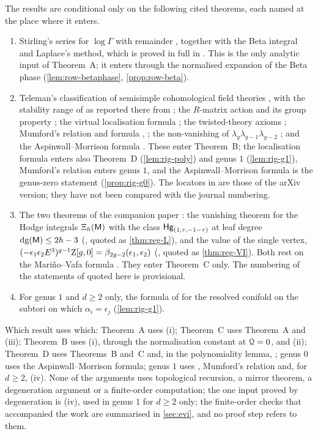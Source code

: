 The results are conditional only on the following cited theorems, each named at the place where it enters.
\begin{enumerate}
\item Stirling's series for $\log\Gamma$ with remainder \cite[5.11.1 and Section~5.11(ii)]{DLMF}, together with the Beta integral \cite[5.12.1]{DLMF} and Laplace's method, which is proved in full in . This is the only analytic input of Theorem~A; it enters through the normalised expansion of the Beta phase (\cref{lem:row-betaphase}, \cref{prop:row-beta}).
\item Teleman's classification of semisimple cohomological field theories \cite[Theorem~(2), (1.15), Prop.~8.7(ii)]{Tel12}, with the stability range of \cite[2.17--2.19, (2.15)]{Tel12} as reported there from \cite{Loo96,MW07,Har85,Iva90}; the $R$-matrix action and its group property \cite[Defs.~2.2, 2.13, Prop.~2.14]{PPZ15}; the virtual localisation formula \cite{GP99}; the twisted-theory axioms \cite[App.~1]{CG07}; Mumford's relation and formula \cite{Mum83}, \cite[Section~1.1]{FP00}; the non-vanishing of $\lambda_g\lambda_{g-1}\lambda_{g-2}$ \cite[Theorem~4]{FP00}; and the Aspinwall--Morrison formula \cite[p.~3]{FP00}. These enter Theorem~B; the localisation formula \cite{GP99} enters also Theorem~D (\cref{lem:rig-poly}) and genus $1$ (\cref{lem:rig-g1}), Mumford's relation enters genus $1$, and the Aspinwall--Morrison formula is the genus-zero statement (\cref{prop:rig-g0}). The locators in \cite{Tel12} are those of the arXiv version; they have not been compared with the journal numbering.
\item The two theorems of the companion paper \cite{LP2}: the vanishing theorem for the Hodge integrals $\Xi_h(\mathsf{M})$ with the class $\mathsf{Hg}_{(1,\tau,-1-\tau)}$ at leaf degree $\mathrm{dg}(\mathsf{M})\leq2h-3$ (\cite[Theorem~8.1, Corollaries~8.2--8.4]{LP2}, quoted as \cref{thm:reg-L}), and the value of the single vertex, $(-\epsilon_1\epsilon_2E^3)^{g-1}\mathrm{Z}[g,0]=\beta_{2g-2}(\epsilon_1,\epsilon_2)$ (\cite[Theorem~9.1]{LP2}, quoted as \cref{thm:reg-VI}). Both rest on the Mari\~no--Vafa formula \cite[(1)--(3)]{LLZ03}. They enter Theorem~C only. The numbering of the statements of \cite{LP2} quoted here is provisional.
\item For genus $1$ and $d\geq2$ only, the formula of \cite{BS} for the resolved conifold on the subtori on which $\alpha_i=\epsilon_j$ (\cref{lem:rig-g1}).
\end{enumerate}
Which result uses which: Theorem~A uses (i); Theorem~C uses Theorem~A and (iii); Theorem~B uses (i), through the normalisation constant at $\mathcal{Q}=0$, and (ii); Theorem~D uses Theorems~B and~C and, in the polynomiality lemma, \cite{GP99}; genus $0$ uses the Aspinwall--Morrison formula; genus $1$ uses \cite{GP99}, Mumford's relation and, for $d\geq2$, (iv). None of the arguments uses topological recursion, a mirror theorem, a degeneration argument or a finite-order computation; the one input proved by degeneration is (iv), used in genus $1$ for $d\geq2$ only; the finite-order checks that accompanied the work are summarised in \cref{sec:evi}, and no proof step refers to them.

